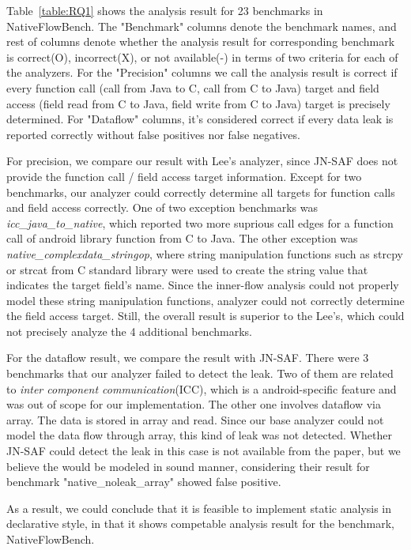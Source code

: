 Table~\ref{table:RQ1} shows the analysis result for 23 benchmarks in
NativeFlowBench.  The "Benchmark" columns denote the benchmark names, and rest
of columns denote whether the analysis result for corresponding benchmark is
correct(O), incorrect(X), or not available(-) in terms of two criteria for each
of the analyzers. For the "Precision" columns we call the analysis result is
correct if every function call (call from Java to C, call from C to Java)
target and field access (field read from C to Java, field write from C to Java)
target is precisely determined. For "Dataflow" columns, it's considered correct
if every data leak is reported correctly without false positives nor false
negatives. 

For precision, we compare our result with Lee's analyzer, since JN-SAF does not
provide the function call / field access target information. Except for two
benchmarks, our analyzer could correctly determine all targets for function
calls and field access correctly.  One of two exception benchmarks was
\textit{icc\_java\_to\_native}, which reported two more suprious call edges for
a function call of android library function from C to Java. The other exception
was \textit{native\_complexdata\_stringop}, where string manipulation functions
such as strcpy or strcat from C standard library were used to create the string
value that indicates the target field's name. Since the inner-flow analysis
could not properly model these string manipulation functions, analyzer could
not correctly determine the field access target. Still, the overall result is
superior to the Lee's, which could not precisely analyze the 4 additional
benchmarks.

For the dataflow result, we compare the result with JN-SAF. There were 3
benchmarks that our analyzer failed to detect the leak. Two of them are related
to \textit{inter component communication}(ICC), which is a android-specific
feature and was out of scope for our implementation. The other one involves
dataflow via array. The data is stored in array and read. Since our base
analyzer could not model the data flow through array, this kind of leak was not
detected. Whether JN-SAF could detect the leak in this case is not available
from the paper, but we believe the would be modeled in sound manner,
considering their result for benchmark "native\_noleak\_array" showed false
positive. 

As a result, we could conclude that it is feasible to implement static analysis
in declarative style, in that it shows competable analysis result for the
benchmark, NativeFlowBench.


